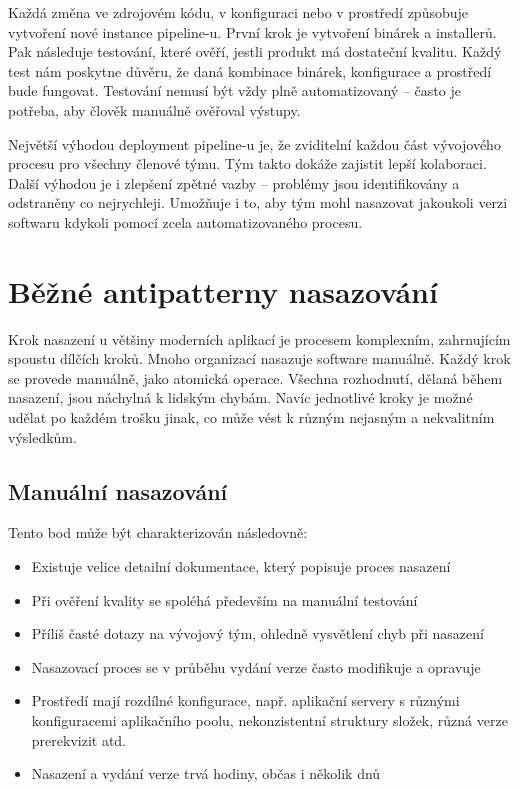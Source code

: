 Každá změna ve zdrojovém kódu, v konfiguraci nebo v prostředí způsobuje vytvoření nové instance pipeline-u. První krok je vytvoření binárek a installerů. Pak následuje testování, které ověří, jestli produkt má dostateční kvalitu. Každý test nám poskytne důvěru, že daná kombinace binárek, konfigurace a prostředí bude fungovat. Testování nemusí být vždy plně automatizovaný -- často je potřeba, aby člověk manuálně ověřoval výstupy. 

Největší výhodou deployment pipeline-u je, že zviditelní každou část vývojového procesu pro všechny členové týmu. Tým takto dokáže zajistit lepší kolaboraci. Další výhodou je i zlepšení zpětné vazby -- problémy jsou identifikovány a odstraněny co nejrychleji. Umožňuje i to, aby tým mohl nasazovat jakoukoli verzi softwaru kdykoli pomocí zcela automatizovaného procesu.

\section{Běžné antipatterny nasazování}
Krok nasazení u většiny moderních aplikací je procesem komplexním, zahrnujícím spoustu dílčích kroků. Mnoho organizací nasazuje software manuálně. Každý krok se provede manuálně, jako atomická operace. Všechna rozhodnutí, dělaná během nasazení, jsou náchylná k lidským chybám. Navíc jednotlivé kroky je možné udělat po každém trošku jinak, co může vést k různým nejasným a nekvalitním výsledkům.

\subsection{Manuální nasazování}
Tento bod může být charakterizován následovně:

\begin{itemize}
  \item Existuje velice detailní dokumentace, který popisuje proces nasazení
  \item Při ověření kvality se spoléhá především na manuální testování 
  \item Příliš časté dotazy na vývojový tým, ohledně vysvětlení chyb při nasazení
  \item Nasazovací proces se v průběhu vydání verze často modifikuje a opravuje
  \item Prostředí mají rozdílné konfigurace, např. aplikační servery s různými konfiguracemi aplikačního poolu, nekonzistentní struktury složek, různá verze prerekvizit atd.
  \item Nasazení a vydání verze trvá hodiny, občas i několik dnů
\end{itemize}

